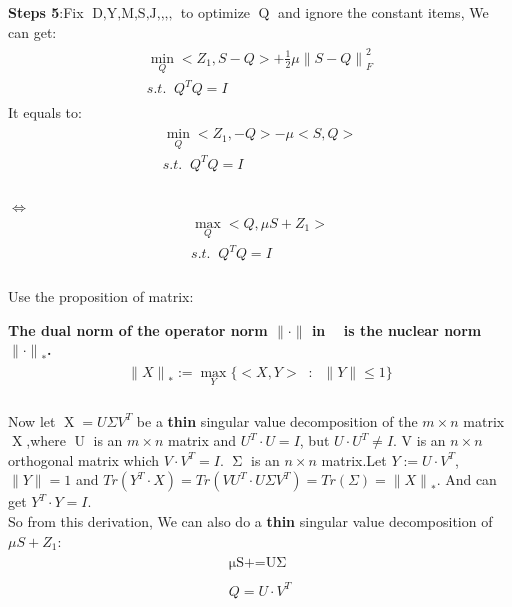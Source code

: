 \documentclass{article}
\begin{document}
\begin{flushleft}
\textbf{Steps 5}:\;\;Fix $\mathop{D,Y,M,S,J,Z_1,Z_2,Z_3,Z_4}$ to optimize $\mathop{Q}$ and ignore the constant items, We can get:
\begin{eqnarray}
\begin{array}{l}
    \mathop{\min}\limits_{Q} <Z_1,S-Q> + \frac{1}{2}\mu {\parallel S - Q \parallel}_F^2  \\
    s.t. \;\; Q^TQ = I
\end{array}
\end{eqnarray}
It equals to:
\begin{eqnarray}
\begin{array}{lll}
    \mathop{\min}\limits_{Q} <Z_1,-Q> - \mu <S,Q>  \\
    s.t. \;\; Q^TQ = I \\
\end{array}
\end{eqnarray}\\
$\Longleftrightarrow$
\begin{eqnarray}
\begin{array}{lll}
    \mathop{\max}\limits_{Q} <Q,\mu S+Z_1>  \\
    s.t. \;\; Q^TQ = I
\end{array}
\end{eqnarray}\\
Use the proposition of matrix:
\end{flushleft}
\textbf{The dual norm of the operator norm $\parallel \cdot \parallel$ in $\mathop{R^{m\times n}}$ is the nuclear norm ${\parallel \cdot \parallel}_{\ast}$.}\\
\begin{eqnarray}
\begin{array}{lll}
    {\parallel X\parallel}_{\ast} := \mathop{\max}\limits_{Y} \{ <X, Y> \;\; : \;\; \parallel Y\parallel \leq 1 \}
\end{array}
\end{eqnarray}\\
Now let $\mathop{X} = U\Sigma V^T $ be a \textbf{thin} singular value decomposition of the $m \times n$ matrix $\mathop{X}$,where $\mathop{U}$ is an $m \times n$ matrix and $U^T \cdot U=I$, but $U \cdot U^T \neq I$. V is an $n \times n$ orthogonal matrix which $V \cdot V^T=I$.\; $\mathop{\Sigma}$ is an $n\times n$ matrix.Let $Y :=U\cdot V^T $,$\parallel Y \parallel = 1$ and $Tr(Y^T \cdot X) = Tr(VU^T \cdot U\Sigma V^T)=Tr(\Sigma)={\parallel X\parallel}_{\ast}$. And can get $Y^T\cdot Y=I$.\\
So from this derivation, We can also do a \textbf{thin} singular value decomposition of $\mu S+Z_1 $:\\
\begin{eqnarray}
\begin{array}{lll}
\mathop{\mu S+Z_1 = U \Sigma V^T} \nonumber \\\\
Q = U\cdot V^T
\end{array}
\end{eqnarray}
\end{document}
